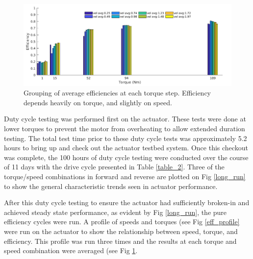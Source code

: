 
\begin{figure}[t]
   \centering
   \includegraphics[width=0.8\linewidth]{fig/eff_test_bar_plot_v3}
   \caption{Grouping of average efficiencies at each torque step.
   Efficiency depends heavily on torque, and slightly on speed.}
   \label{eff_results}
\end{figure}

Duty cycle testing was performed first on the actuator.
These tests were done at lower torques to prevent the motor from overheating to allow extended duration testing.
The total test time prior to these duty cycle tests was approximately 5.2 hours to bring up and check out the actuator testbed system.
Once this checkout was complete, the 100 hours of duty cycle testing were conducted over the course of 11 days with the drive cycle presented in Table \ref{table_2}.
Three of the torque/speed combinations in forward and reverse are plotted on Fig \ref{long_run} to show the general characteristic trends seen in actuator performance.

After this duty cycle testing to ensure the actuator had sufficiently broken-in and achieved steady state performance, as evident by Fig \ref{long_run}, the pure efficiency cycles were run.
A profile of speeds and torques (see Fig \ref{eff_profile} were run on the actuator to show the relationship between speed, torque, and efficiency.
This profile was run three times and the results at each torque and speed combination were averaged (see Fig \ref{eff_results}.

